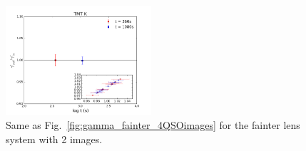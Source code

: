 \documentclass[a4paper,11pt]{article}
\begin{document}
{\begin{figure}
\begin{center}
\includegraphics[width=0.48\textwidth]{figures/gamma_135949_anti_2QSOimages_TMT.png}
\end{center}
\caption{Same as Fig.~\ref{fig:gamma_fainter_4QSOimages} for the fainter lens system with 2 images.
\label{fig:gamma_fainter_2QSOimages}}
\end{figure}

}
\end{document}
